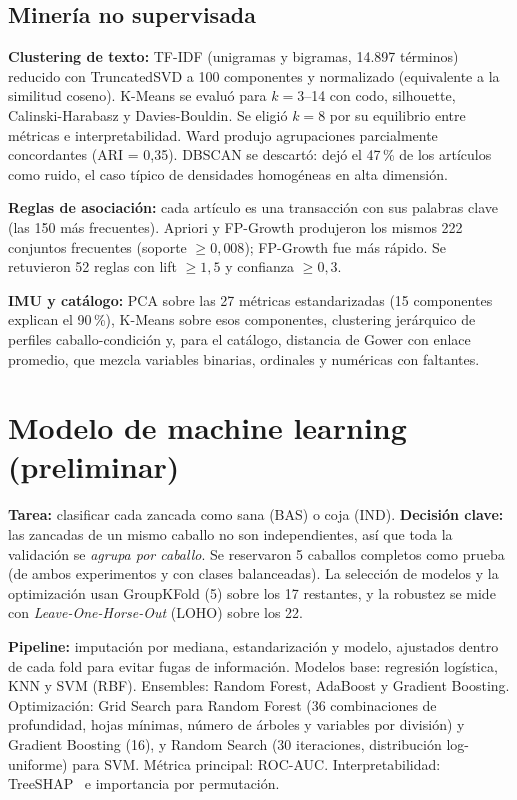 \documentclass[conference,a4paper]{IEEEtran}
\begin{document}
\subsection{Minería no supervisada}
\textbf{Clustering de texto:} TF-IDF (unigramas y bigramas, 14.897 términos) reducido con TruncatedSVD a 100 componentes y normalizado (equivalente a la similitud coseno). K-Means se evaluó para $k=3$--14 con codo, silhouette, Calinski-Harabasz y Davies-Bouldin. Se eligió $k=8$ por su equilibrio entre métricas e interpretabilidad. Ward produjo agrupaciones parcialmente concordantes (ARI = 0,35). DBSCAN se descartó: dejó el 47\,\% de los artículos como ruido, el caso típico de densidades homogéneas en alta dimensión.

\textbf{Reglas de asociación:} cada artículo es una transacción con sus palabras clave (las 150 más frecuentes). Apriori y FP-Growth produjeron los mismos 222 conjuntos frecuentes (soporte $\geq 0{,}008$); FP-Growth fue más rápido. Se retuvieron 52 reglas con lift $\geq 1{,}5$ y confianza $\geq 0{,}3$.

\textbf{IMU y catálogo:} PCA sobre las 27 métricas estandarizadas (15 componentes explican el 90\,\%), K-Means sobre esos componentes, clustering jerárquico de perfiles caballo-condición y, para el catálogo, distancia de Gower con enlace promedio, que mezcla variables binarias, ordinales y numéricas con faltantes.

\section{Modelo de machine learning (preliminar)}
\label{sec:ml}
\textbf{Tarea:} clasificar cada zancada como sana (BAS) o coja (IND). \textbf{Decisión clave:} las zancadas de un mismo caballo no son independientes, así que toda la validación se \emph{agrupa por caballo}. Se reservaron 5 caballos completos como prueba (de ambos experimentos y con clases balanceadas). La selección de modelos y la optimización usan GroupKFold (5) sobre los 17 restantes, y la robustez se mide con \emph{Leave-One-Horse-Out} (LOHO) sobre los 22.

\textbf{Pipeline:} imputación por mediana, estandarización y modelo, ajustados dentro de cada fold para evitar fugas de información. Modelos base: regresión logística, KNN y SVM (RBF). Ensembles: Random Forest, AdaBoost y Gradient Boosting. Optimización: Grid Search para Random Forest (36 combinaciones de profundidad, hojas mínimas, número de árboles y variables por división) y Gradient Boosting (16), y Random Search (30 iteraciones, distribución log-uniforme) para SVM. Métrica principal: ROC-AUC. Interpretabilidad: TreeSHAP~\cite{lundberg2017} e importancia por permutación.
\end{document}
